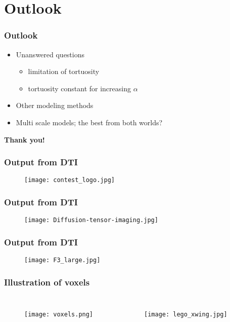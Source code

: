 \documentclass{beamer}
\begin{document}
\section{Outlook}
\begin{frame}
 \frametitle{Outlook}
  \begin{itemize}
   \item Unanswered questions 
   \begin{itemize}
    \item limitation of tortuosity
    \item tortuosity constant for increasing $\alpha$
   \end{itemize}
   \item Other modeling methods
   \item Multi scale models; the best from both worlds?
  \end{itemize}
% 
\end{frame}

\begin{frame}
\begin{center}
 \textbf{Thank you!}
\end{center}
\end{frame}

\begin{frame}
\frametitle{Output from DTI}
\begin{figure}
 \texttt{[image: contest\_logo.jpg]}
\end{figure}
\end{frame}

\begin{frame}
\frametitle{Output from DTI}
\begin{figure}
 \texttt{[image: Diffusion-tensor-imaging.jpg]}
\end{figure}
\end{frame}

\begin{frame}
\frametitle{Output from DTI}
\begin{figure}
 \texttt{[image: F3\_large.jpg]}
\end{figure}
\end{frame}

\begin{frame}
\frametitle{Illustration of voxels}
\begin{columns}
 \column{2.0in}
\begin{figure}
 \texttt{[image: voxels.png]}
\end{figure}
\column{2.0in}
\begin{figure}[]
 \texttt{[image: lego\_xwing.jpg]}
\end{figure}

\end{columns}
\end{frame}
\end{document}
